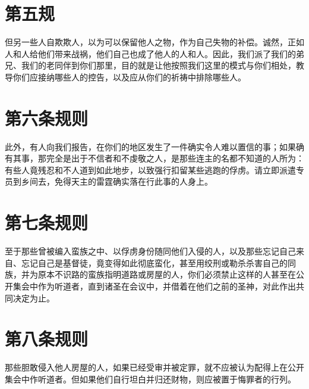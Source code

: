 
\section{第五规}

但另一些人自欺欺人，以为可以保留他人之物，作为自己失物的补偿。诚然，正如人和人给他们带来战祸，他们自己也成了他人的人和人。因此，我们派了我们的弟兄、我们的老同伴到你们那里，目的就是让他按照我们这里的模式与你们相处，教导你们应接纳哪些人的控告，以及应从你们的祈祷中排除哪些人。\par


\section{第六条规则}

此外，有人向我们报告，在你们的地区发生了一件确实令人难以置信的事；如果确有其事，那完全是出于不信者和不虔敬之人，是那些连主的名都不知道的人所为：有些人竟残忍和不人道到如此地步，以致强行扣留某些逃跑的俘虏。请立即派遣专员到乡间去，免得天主的雷霆确实落在行此事的人身上。\par


\section{第七条规则}

至于那些曾被编入蛮族之中、以俘虏身份随同他们入侵的人，以及那些忘记自己来自、忘记自己是基督徒，竟变得如此彻底蛮化，甚至用绞刑或勒杀杀害自己的同族，并为原本不识路的蛮族指明道路或房屋的人，你们必须禁止这样的人甚至在公开集会中作为听道者，直到诸圣在会议中，并借着在他们之前的圣神，对此作出共同决定为止。\par


\section{第八条规则}

那些胆敢侵入他人房屋的人，如果已经受审并被定罪，就不应被认为配得上在公开集会中作听道者。但如果他们自行坦白并归还财物，则应被置于悔罪者的行列。\par

